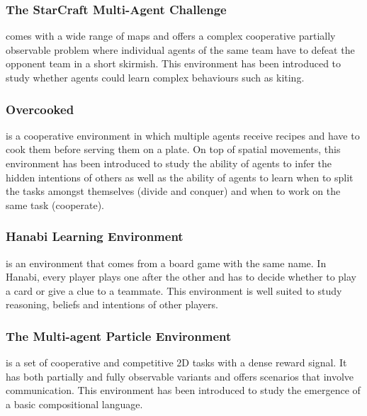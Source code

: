 \subsubsection{The StarCraft Multi-Agent Challenge} \citep[SMAC]{samvelyan19smac} comes with a wide range of maps and offers a complex cooperative partially observable problem where individual agents of the same team have to defeat the opponent team in a short skirmish. This environment has been introduced to study whether agents could learn complex behaviours such as kiting.

\subsubsection{Overcooked} \citep{overcooked_wu_wang2021too} is a cooperative environment in which multiple agents receive recipes and have to cook them before serving them on a plate. On top of spatial movements, this environment has been introduced to study the ability of agents to infer the hidden intentions of others as well as the ability of agents to learn when to split the tasks amongst themselves (divide and conquer) and when to work on the same task (cooperate).

\subsubsection{Hanabi Learning Environment} \citep[HLE]{bard_hanabi_2020} is an environment that comes from a board game with the same name. In Hanabi, every player plays one after the other and has to decide whether to play a card or give a clue to a teammate. This environment is well suited to study reasoning, beliefs and intentions of other players.

\subsubsection{The Multi-agent Particle Environment} \citep[MPE]{mpe_lowe2017multi, mpe_mordatch2017emergence} is a set of cooperative and competitive 2D tasks with a dense reward signal. It has both partially and fully observable variants and offers scenarios that involve communication. This environment has been introduced to study the emergence of a basic compositional language.

